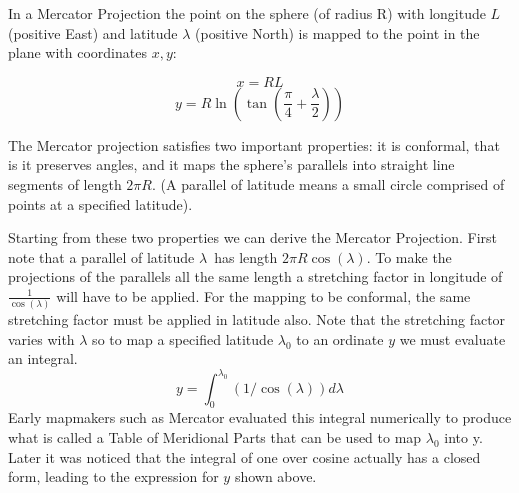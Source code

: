 \documentclass[12pt]{article}
\begin{document}
In a Mercator Projection the point on the sphere (of radius R) with longitude $L$ (positive East) and latitude $\lambda$ (positive North) is mapped to the point in the plane with coordinates $x,y$:

$$
x = R L
$$
$$
y = R \ln(\tan( \frac{\pi}{4} + \frac{\lambda}{2}))
$$

The Mercator projection satisfies two important properties: it is conformal, that is it preserves angles, and it maps the sphere's parallels into straight line segments of length $2\pi R$.  (A parallel of latitude means a small circle comprised of points at a specified latitude).

Starting from these two properties we can derive the Mercator Projection.  First note that a parallel of latitude $\lambda$\ has length $2\pi R \cos( \lambda)$.    To make the projections of the parallels all the same length a stretching factor in longitude of $\frac{1}{\cos( \lambda)}$ will have to be applied.  For the mapping to be conformal, the same stretching factor must be applied in latitude also.  Note that the stretching factor varies with $\lambda$ so to map a specified latitude $\lambda_0$ to an ordinate $y$ we must evaluate an integral.
$$
y = \int_{0}^{\lambda_0} (1/\cos( \lambda)) d\lambda
$$
Early mapmakers such as Mercator evaluated this integral numerically to produce what is called a Table of Meridional Parts that can be used to map $\lambda_0$ into y.  Later it was noticed that the integral of one over cosine actually has a closed form, leading to the expression for $y$ shown above.
\end{document}
